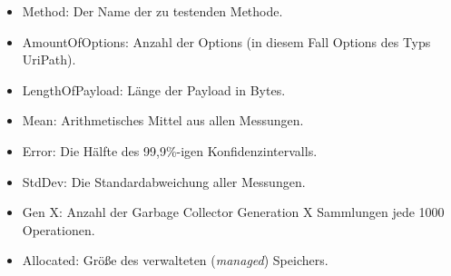 \begin{table}[h]
    \caption{Benchmark mit 100000 Options und mit einer Payload von 1000000000 Bytes (1 GB)}
    \label{tab:benchmark-100000-1000000000}
\end{table}

\begin{itemize}
    \item Method: Der Name der zu testenden Methode.
    \item AmountOfOptions: Anzahl der Options (in diesem Fall Options des Typs UriPath).
    \item LengthOfPayload: Länge der Payload in Bytes.
    \item Mean: Arithmetisches Mittel aus allen Messungen.
    \item Error: Die Hälfte des 99,9\%-igen Konfidenzintervalls.
    \item StdDev: Die Standardabweichung aller Messungen.
    \item Gen X: Anzahl der Garbage Collector Generation X Sammlungen jede 1000 Operationen.
    \item Allocated: Größe des verwalteten (\textit{managed}) Speichers.
\end{itemize}

